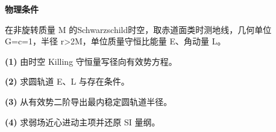 \textbf{物理条件}\par 在非旋转质量 M 的Schwarzschild时空，取赤道面类时测地线，几何单位 G=c=1，半径 r>2M，单位质量守恒比能量 E、角动量 L。
\par\noindent\textbf{(1)} 由时空 Killing 守恒量写径向有效势方程。
\par\noindent\textbf{(2)} 求圆轨道 E、L 与存在条件。
\par\noindent\textbf{(3)} 从有效势二阶导出最内稳定圆轨道半径。
\par\noindent\textbf{(4)} 求弱场近心进动主项并还原 SI 量纲。
